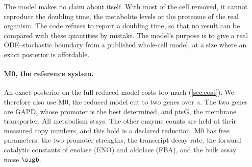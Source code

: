 The model makes no claim about \syn{} itself. With most of the cell removed, it
cannot reproduce the doubling time, the metabolite levels or the proteome of the
real organism. The code refuses to report a doubling time, so that no result can
be compared with these quantities by mistake. The model's purpose is to give a
real ODE--stochastic boundary from a published whole-cell model, at a size where an
exact posterior is affordable.

\paragraph{M0, the reference system.} An exact posterior on the full reduced model
costs too much (\cref{sec:cost}). We therefore also use M0, the reduced model cut
to two genes over \,s. The two genes are GAPD, whose promoter is
the best determined, and ptsG, the membrane transporter. All metabolism stays. The
other enzyme counts are held at their measured copy numbers, and this hold is a
declared reduction. M0 has  free parameters: the two promoter
strengths, the transcript decay rate, the forward catalytic constants of enolase
(ENO) and aldolase (FBA), and the bulk assay noise $\sigb$.
